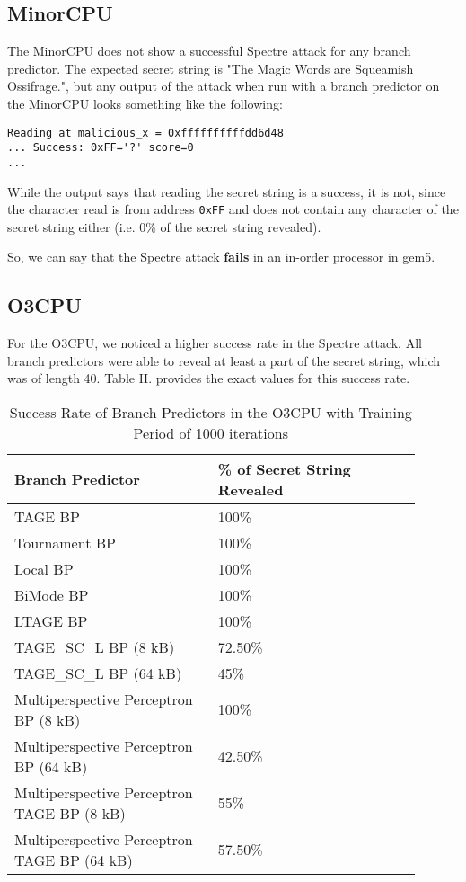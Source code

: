 \documentclass[twocolumn,showpacs,%
  nofootinbib,aps,superscriptaddress,%
  eqsecnum,prd,notitlepage,showkeys,10pt]{revtex4-1}
\begin{document}
\subsection{MinorCPU}

The MinorCPU does not show a successful Spectre attack for any branch predictor. The expected secret string is "The Magic Words are Squeamish Ossifrage.", but any output of the attack when run with a branch predictor on the MinorCPU looks something like the following:

\begin{verbatim}
Reading at malicious_x = 0xffffffffffdd6d48 
... Success: 0xFF='?' score=0
...
\end{verbatim}

While the output says that reading the secret string is a success, it is not, since the character read is from address \texttt{0xFF} and does not contain any character of the secret string either (i.e. 0\% of the secret string revealed).

So, we can say that the Spectre attack \textbf{fails} in an in-order processor in gem5.

\subsection{O3CPU}

For the O3CPU, we noticed a higher success rate in the Spectre attack. All branch predictors were able to reveal at least a part of the secret string, which was of length 40. Table II. provides the exact values for this success rate.

\begin{table}
\centering
\caption{Success Rate of Branch Predictors in the O3CPU with Training Period of 1000 iterations}
\small
\begin{tabular}{|p{0.45\linewidth}|p{0.45\linewidth}|}
\hline
Branch Predictor & \% of Secret String Revealed \\
\hline
TAGE BP & 100\% \\
Tournament BP & 100\% \\
Local BP & 100\% \\
BiMode BP & 100\% \\
LTAGE BP & 100\% \\
TAGE\_SC\_L BP (8 kB) & 72.50\% \\
TAGE\_SC\_L BP (64 kB) & 45\% \\
Multiperspective Perceptron BP (8 kB) & 100\% \\
Multiperspective Perceptron BP (64 kB) & 42.50\% \\
Multiperspective Perceptron TAGE BP (8 kB) & 55\% \\
Multiperspective Perceptron TAGE BP (64 kB) & 57.50\% \\
\hline
\end{tabular}
\end{table}
\end{document}
